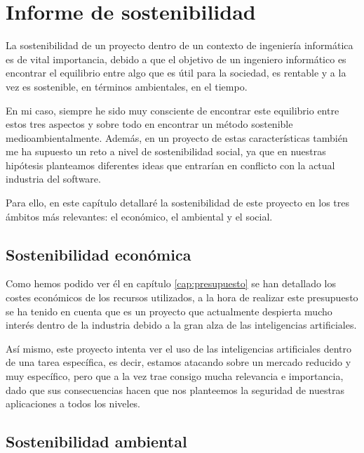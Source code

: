 \chapter{Informe de sostenibilidad}
\label{cap:sostenibilidad}


La sostenibilidad de un proyecto dentro de un contexto de ingeniería informática es de vital importancia, debido a que el objetivo de un ingeniero informático
es encontrar el equilibrio entre algo que es útil para la sociedad, es rentable y a la vez es sostenible, en términos ambientales, en el tiempo.

En mi caso, siempre he sido muy consciente de encontrar este equilibrio entre estos tres aspectos y sobre todo en encontrar un método sostenible medioambientalmente. Además, en
un proyecto de estas características también me ha supuesto un reto a nivel de sostenibilidad social, ya que en nuestras hipótesis planteamos diferentes
ideas que entrarían en conflicto con la actual industria del software.

Para ello, en este capítulo detallaré la sostenibilidad de este proyecto en los tres ámbitos más relevantes: el económico, el ambiental y el social.

\section{Sostenibilidad económica}
\label{sec:sostenibilidad_economica}


Como hemos podido ver él en capítulo \ref{cap:presupuesto} se han detallado los costes económicos de los recursos utilizados, a la hora de realizar este presupuesto se ha tenido
en cuenta que es un proyecto que actualmente despierta mucho interés dentro de la industria debido a la gran alza de las inteligencias artificiales.

Así mismo, este proyecto intenta ver el uso de las inteligencias artificiales dentro de una tarea específica, es decir, estamos atacando sobre un mercado reducido y muy específico,
pero que a la vez trae consigo mucha relevancia e importancia, dado que sus consecuencias hacen que nos planteemos la seguridad de nuestras aplicaciones a todos los niveles.

\section{Sostenibilidad ambiental}
\label{sec:sostenibilidad_ambiental}

